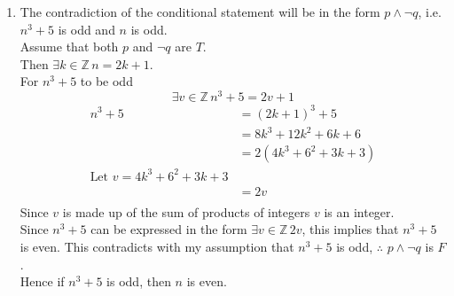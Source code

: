 \documentclass[12pt letter]{report}
\begin{document}
\begin{myproof}
\begin{enumerate}
		\item
		      The contradiction of the conditional statement will be in the form $p \wedge  \neg q$, i.e. $n^3 + 5$ is odd
		      and $n$ is odd.\\
		      Assume that both $p$ and $\neg q$ are $T$.\\
		      Then $\exists k \in \mathbb{Z} \, n = 2k + 1$. \\
		      For $n^3 + 5$ to be odd
		      \[
			      \exists v \in \mathbb{Z}\, n^3 + 5 = 2v + 1
		      \]
		      \begin{align*}
			      n^3 + 5 & = \left( 2k + 1 \right)^3 + 5          \\
			              & = 8k^3 + 12k^2 + 6k + 6                \\
			              & = 2 \left( 4k^3 + 6^2 + 3k + 3 \right) \\
			      \text{Let } v =  4k^3 + 6^2 + 3k + 3             \\
			              & = 2v                                   \\
		      \end{align*}
		      Since $v$ is made up of the sum of products of integers $v$ is an integer.\\
		      Since $n^3 + 5$ can be expressed in the form $\exists v \in \mathbb{Z} \, 2v$, this implies that $n^3 + 5$
		      is even. This contradicts with my assumption that $n^3 + 5$ is odd, $\therefore$ $p \wedge \neg q$ is
		      $F$.\\
		      Hence if $n^3 + 5$ is odd, then $n$ is even.
	\end{enumerate}
\end{myproof}

\end{document}
